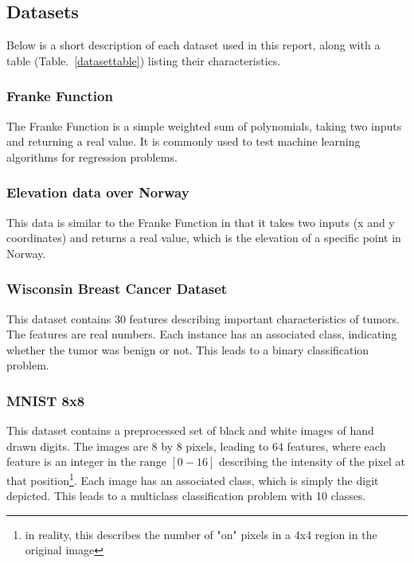 \documentclass[onecolumn,10pt,cleanfoot]{asme2ej}
\begin{document}
\subsection{Datasets}

Below is a short description of each dataset used in this report, along with a table (Table.~\ref{datasettable}) listing their characteristics.

\subsubsection{Franke Function}

The Franke Function is a simple weighted sum of polynomials, taking two inputs and returning a real value. It is commonly used to test machine learning algorithms for regression problems.

\subsubsection{Elevation data over Norway}

This data is similar to the Franke Function in that it takes two inputs (x and y coordinates) and returns a real value, which is the elevation of a specific point in Norway.

\subsubsection{Wisconsin Breast Cancer Dataset}

This dataset contains 30 features describing important characteristics of tumors. The features are real numbers. Each instance has an associated class, indicating whether the tumor was benign or not. This leads to a binary classification problem.

\subsubsection{MNIST 8x8}

This dataset contains a preprocessed set of black and white images of hand drawn digits. The images are 8 by 8 pixels, leading to 64 features, where each feature is an integer in the range $[0-16]$ describing the intensity of the pixel at that position\footnote{in reality, this describes the number of "on" pixels in a 4x4 region in the original image}. Each image has an associated class, which is simply the digit depicted. This leads to a multiclass classification problem with 10 classes.
\end{document}

